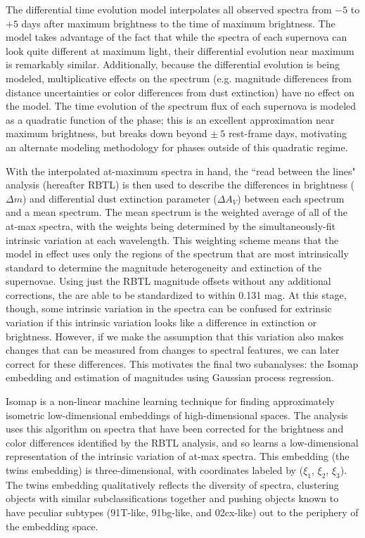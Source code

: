 The differential time evolution model interpolates all observed spectra from $-5$ to $+5$ days after maximum brightness to the time of maximum brightness. The model takes advantage of the fact that while the spectra of each supernova can look quite different at maximum light, their differential evolution near maximum is remarkably similar. Additionally, because the differential evolution is being modeled, multiplicative effects on the spectrum (e.g. magnitude differences from distance uncertainties or color differences from dust extinction) have no effect on the model. The time evolution of the spectrum flux of each supernova is modeled as a quadratic function of the phase; this is an excellent approximation near maximum brightness, but breaks down beyond $\pm~5$ rest-frame days, motivating an alternate modeling methodology for phases outside of this quadratic regime.

With the interpolated at-maximum spectra in hand, the ``read between the lines" analysis (hereafter RBTL) is then used to describe the differences in brightness ($\Delta m$) and differential dust extinction parameter ($\Delta A_V$) between each spectrum and a mean spectrum. The mean spectrum is the weighted average of all of the at-max spectra, with the weights being determined by the simultaneously-fit intrinsic variation at each wavelength. This weighting scheme means that the model in effect uses only the regions of the spectrum that are most intrinsically standard to determine the magnitude heterogeneity and extinction of the supernovae. Using just the RBTL magnitude offsets without any additional corrections, the \sne are able to be standardized to within 0.131 mag. At this stage, though, some intrinsic variation in the spectra can be confused for extrinsic variation if this intrinsic variation looks like a difference in extinction or brightness. However, if we make the assumption that this variation also makes changes that can be measured from changes to spectral features, we can later correct for these differences. This motivates the final two subanalyses: the Isomap embedding and estimation of magnitudes using Gaussian process regression.

Isomap is a non-linear machine learning technique for finding approximately isometric low-dimensional embeddings of high-dimensional spaces. The  analysis uses this algorithm on spectra that have been corrected for the brightness and color differences identified by the RBTL analysis, and so learns a low-dimensional representation of the intrinsic variation of at-max spectra. This embedding (the twins embedding) is three-dimensional, with coordinates labeled by ($\xi_1$, $\xi_2$, $\xi_3$). The twins embedding qualitatively reflects the diversity of \sn spectra, clustering objects with similar subclassifications together and pushing objects known to have peculiar subtypes (91T-like, 91bg-like, and 02cx-like) out to the periphery of the embedding space. 

